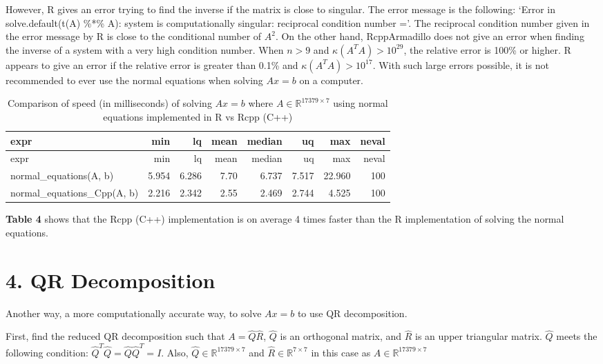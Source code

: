 \documentclass[
]{article}
\begin{document}
However, R gives an error trying to find the inverse if the matrix is
close to singular. The error message is the following: `Error in
solve.default(t(A) \%*\% A): system is computationally singular:
reciprocal condition number ='. The reciprocal condition number given in
the error message by R is close to the conditional number of \(A^{2}\).
On the other hand, RcppArmadillo does not give an error when finding the
inverse of a system with a very high condition number. When \(n > 9\)
and \(\kappa(A^{T}A) > 10^{29}\), the relative error is 100\% or higher.
R appears to give an error if the relative error is greater than 0.1\%
and \(\kappa(A^{T}A) > 10^{17}\). With such large errors possible, it is
not recommended to ever use the normal equations when solving \(Ax = b\)
on a computer.

\begin{longtable}[]{@{}lrrrrrrr@{}}
\caption{Comparison of speed (in milliseconds) of solving \(Ax = b\)
where \(A \in \mathbb{R}^{17379 \times 7}\) using normal equations
implemented in R vs Rcpp (C++)}\tabularnewline
\toprule
expr & min & lq & mean & median & uq & max & neval\tabularnewline
\midrule
\endfirsthead
\toprule
expr & min & lq & mean & median & uq & max & neval\tabularnewline
\midrule
\endhead
normal\_equations(A, b) & 5.954 & 6.286 & 7.70 & 6.737 & 7.517 & 22.960
& 100\tabularnewline
normal\_equations\_Cpp(A, b) & 2.216 & 2.342 & 2.55 & 2.469 & 2.744 &
4.525 & 100\tabularnewline
\bottomrule
\end{longtable}

\textbf{Table 4} shows that the Rcpp (C++) implementation is on average
4 times faster than the R implementation of solving the normal
equations.

\hypertarget{qr-decomposition}{%
\section{4. QR Decomposition}\label{qr-decomposition}}

Another way, a more computationally accurate way, to solve \(Ax = b\) to
use QR decomposition.

First, find the reduced QR decomposition such that
\(A = \hat{Q}\hat{R}\), \(\hat{Q}\) is an orthogonal matrix, and
\(\hat{R}\) is an upper triangular matrix. \(\hat{Q}\) meets the
following condition: \(\hat{Q}^{T}\hat{Q} = \hat{Q}\hat{Q}^{T} = I\).
Also, \(\hat{Q} \in \mathbb{R}^{17379 \times 7}\) and
\(\hat{R} \in \mathbb{R}^{7 \times 7}\) in this case as
\(A \in \mathbb{R}^{17379 \times 7}\)
\end{document}
